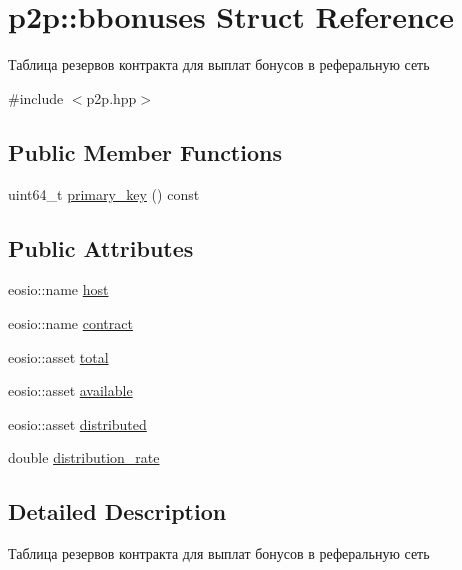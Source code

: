 \hypertarget{structp2p_1_1bbonuses}{}\section{p2p\+:\+:bbonuses Struct Reference}
\label{structp2p_1_1bbonuses}


Таблица резервов контракта для выплат бонусов в реферальную сеть  




{\ttfamily \#include $<$p2p.\+hpp$>$}

\subsection*{Public Member Functions}
\begin{DoxyCompactItemize}
\item 
uint64\+\_\+t \mbox{\hyperlink{structp2p_1_1bbonuses_a1707459d7b5c7a86f93973cd2af50736}{primary\+\_\+key}} () const
\end{DoxyCompactItemize}
\subsection*{Public Attributes}
\begin{DoxyCompactItemize}
\item 
eosio\+::name \mbox{\hyperlink{structp2p_1_1bbonuses_a196ad62fd6230686cb4cbad9f7ee2aeb}{host}}
\item 
eosio\+::name \mbox{\hyperlink{structp2p_1_1bbonuses_af7676fed529979ab6365421cd6cf72ef}{contract}}
\item 
eosio\+::asset \mbox{\hyperlink{structp2p_1_1bbonuses_a11511c80fc9d57acbf5c61359850ca41}{total}}
\item 
eosio\+::asset \mbox{\hyperlink{structp2p_1_1bbonuses_a931f287a96041d2c581c4c733a62185e}{available}}
\item 
eosio\+::asset \mbox{\hyperlink{structp2p_1_1bbonuses_a14d9c11b5763d73a0c7723556b875349}{distributed}}
\item 
double \mbox{\hyperlink{structp2p_1_1bbonuses_ac0043fc0d3d405501823046c6e9484ed}{distribution\+\_\+rate}}
\end{DoxyCompactItemize}


\subsection{Detailed Description}
Таблица резервов контракта для выплат бонусов в реферальную сеть 

